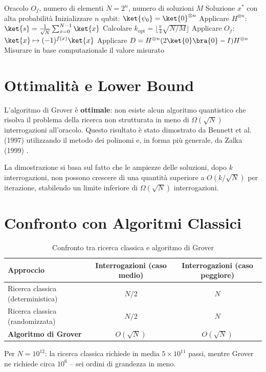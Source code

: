 \begin{onehalfspace}
\begin{algorithm}[H]
\caption{Algoritmo di Grover}
\begin{algorithmic}[1]
\Require Oracolo $O_f$, numero di elementi $N = 2^n$, numero di soluzioni $M$
\Ensure Soluzione $x^*$ con alta probabilità
\State Inizializzare $n$ qubit: $\ket{\psi_0} = \ket{0}^{\otimes n}$
\State Applicare $H^{\otimes n}$: $\ket{s} = \frac{1}{\sqrt{N}}\sum_{x=0}^{N-1}\ket{x}$
\State Calcolare $k_{\text{opt}} = \lfloor\frac{\pi}{4}\sqrt{N/M}\rfloor$
    \State Applicare $O_f$: \quad $\ket{x} \mapsto (-1)^{f(x)}\ket{x}$ 
    \State Applicare $D = H^{\otimes n}(2\ket{0}\bra{0}-I)H^{\otimes n}$ 
\EndFor
\State Misurare in base computazionale
\State \Return il valore misurato
\end{algorithmic}
\end{algorithm}

\section{Ottimalità e Lower Bound}

L'algoritmo di Grover è \textbf{ottimale}: non esiste alcun algoritmo quantistico che risolva il problema della ricerca non strutturata in meno di $\Omega(\sqrt{N})$ interrogazioni all'oracolo. Questo risultato è stato dimostrato da Bennett et al. (1997) \cite{bennett1997} utilizzando il metodo dei polinomi e, in forma più generale, da Zalka (1999) \cite{zalka1999}.

La dimostrazione si basa sul fatto che le ampiezze delle soluzioni, dopo $k$ interrogazioni, non possono crescere di una quantità superiore a $O(k/\sqrt{N})$ per iterazione, stabilendo un limite inferiore di $\Omega(\sqrt{N})$ interrogazioni.

\section{Confronto con Algoritmi Classici}

\begin{table}[H]
\centering
\begin{tabular}{@{}lcc@{}}
\toprule
\textbf{Approccio} & \textbf{Interrogazioni (caso medio)} & \textbf{Interrogazioni (caso peggiore)} \\
\midrule
Ricerca classica (deterministica)  & $N/2$          & $N$           \\
Ricerca classica (randomizzata)    & $N/2$          & $N$           \\
\textbf{Algoritmo di Grover}       & $O(\sqrt{N})$  & $O(\sqrt{N})$ \\
\bottomrule
\end{tabular}
\caption{Confronto tra ricerca classica e algoritmo di Grover}
\end{table}

Per $N = 10^{12}$: la ricerca classica richiede in media $5 \times 10^{11}$ passi, mentre Grover ne richiede circa $10^6$ -- sei ordini di grandezza in meno.

\end{onehalfspace}
